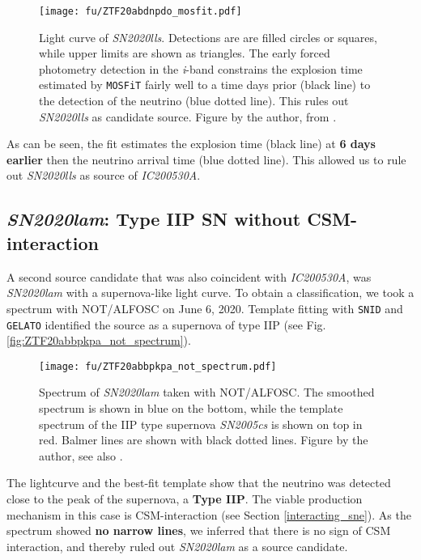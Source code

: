\begin{figure}[htb]
    \texttt{[image: fu/ZTF20abdnpdo\_mosfit.pdf]}
    \caption[\emph{SN2020lls} light curve fit]{Light curve of \emph{SN2020lls}. Detections are are filled circles or squares, while upper limits are shown as triangles. The early forced photometry detection in the \textit{i}-band constrains the explosion time estimated by \texttt{MOSFiT} fairly well to a time days prior (black line) to the detection of the neutrino (blue dotted line). This rules out \emph{SN2020lls} as candidate source. Figure by the author, from \cite{Stein2023a}.}
\end{figure}
As can be seen, the fit estimates the explosion time (black line) at \textbf{6 days earlier} then the neutrino arrival time (blue dotted line). This allowed us to rule out \emph{SN2020lls} as source of \emph{IC200530A}.

\subsection{\emph{SN2020lam}: Type IIP SN without CSM-interaction} \label{SN2020lam}
A second source candidate that was also coincident with \emph{IC200530A}, was \emph{SN2020lam}  with a supernova-like light curve. To obtain a classification, we took a spectrum with NOT/ALFOSC on June 6, 2020. Template fitting with \texttt{SNID} and \texttt{GELATO}  identified the source as a supernova of type IIP (see Fig. \ref{fig:ZTF20abbpkpa_not_spectrum}).

\begin{figure}[h!]
    \texttt{[image: fu/ZTF20abbpkpa\_not\_spectrum.pdf]}
    \caption[\emph{SN2020lam} spectrum]{Spectrum of \emph{SN2020lam} taken with NOT/ALFOSC. The smoothed spectrum is shown in blue on the bottom, while the template spectrum of the IIP type supernova \emph{SN2005cs} is shown on top in red. Balmer lines are shown with black dotted lines. Figure by the author, see also \cite{Stein2023a}.}
\end{figure}

The lightcurve and the best-fit template show that the neutrino was detected close to the peak of the supernova, a \textbf{Type IIP}. The viable production mechanism in this case is CSM-interaction (see Section \ref{interacting_sne}). As the spectrum showed \textbf{no narrow lines}, we inferred that there is no sign of CSM interaction, and thereby ruled out \emph{SN2020lam} as a source candidate.

